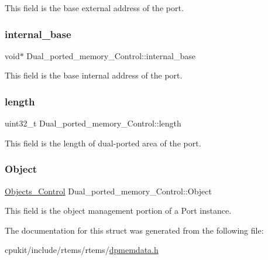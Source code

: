 This field is the base external address of the port. \mbox{\label{structDual__ported__memory__Control_acfa175da8646778f6378d73fd8cde64e}} 
\subsubsection{\texorpdfstring{internal\_base}{internal\_base}}
{\footnotesize\ttfamily void$\ast$ Dual\+\_\+ported\+\_\+memory\+\_\+\+Control\+::internal\+\_\+base}

This field is the base internal address of the port. \mbox{\label{structDual__ported__memory__Control_ab03759c098745dfcb8e4f50664b7301e}} 
\subsubsection{\texorpdfstring{length}{length}}
{\footnotesize\ttfamily uint32\+\_\+t Dual\+\_\+ported\+\_\+memory\+\_\+\+Control\+::length}

This field is the length of dual-\/ported area of the port. \mbox{\label{structDual__ported__memory__Control_a52ad1d36772556927bb8adce7a4f48c7}} 
\subsubsection{\texorpdfstring{Object}{Object}}
{\footnotesize\ttfamily \mbox{\hyperlink{structObjects__Control}{Objects\+\_\+\+Control}} Dual\+\_\+ported\+\_\+memory\+\_\+\+Control\+::\+Object}

This field is the object management portion of a Port instance. 

The documentation for this struct was generated from the following file\+:\begin{DoxyCompactItemize}
\item 
cpukit/include/rtems/rtems/\mbox{\hyperlink{dpmemdata_8h}{dpmemdata.\+h}}\end{DoxyCompactItemize}
